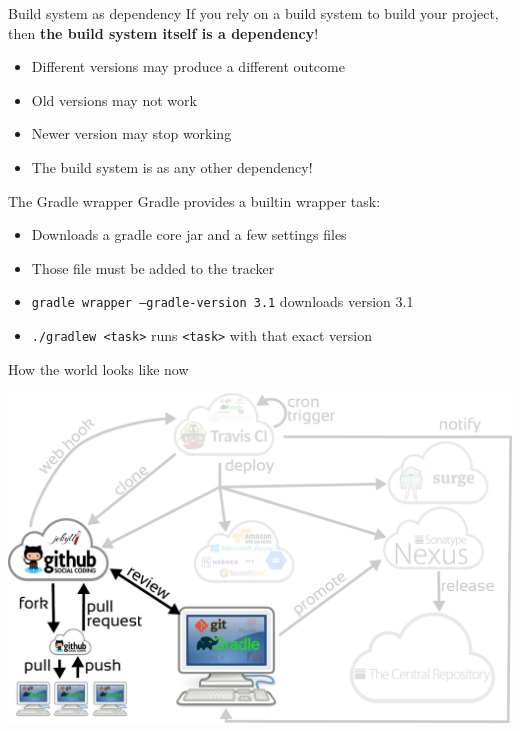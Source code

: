 \documentclass[presentation]{beamer}
\begin{document}
\begin{frame}[fragile]{Build system as dependency}
	If you rely on a build system to build your project, then \textbf{the build system itself is a dependency}!
	\begin{itemize}
		\item Different versions may produce a different outcome
		\item Old versions may not work
		\item Newer version may stop working
		\item The build system is as any other dependency!
	\end{itemize}
	\begin{block}{The Gradle wrapper}
		Gradle provides a builtin wrapper task:
		\begin{itemize}
			\item Downloads a gradle core jar and a few settings files
			\item Those file must be added to the tracker
			\item \texttt{gradle wrapper --gradle-version 3.1} downloads version 3.1
			\item \texttt{./gradlew <task>} runs \texttt{<task>} with that exact version
		\end{itemize}
	\end{block}
\end{frame}

\begin{frame}[fragile]{How the world looks like now}
	\begin{center}
		\includegraphics[width=.9\textwidth]{images/ci-gradle}
	\end{center}
\end{frame}

\end{document}
